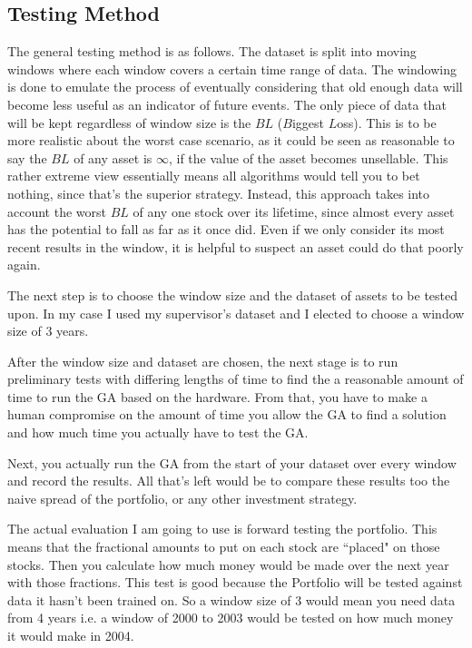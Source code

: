 \documentclass[11pt]{article}
\begin{document}
\subsection{Testing Method}\label{section:TestingMethod}

    The general testing method is as follows. The dataset is split into moving windows
    where each window covers a certain time range of data. The windowing is done to emulate
    the process of eventually considering that old enough data will become less useful
    as an indicator of future events. The only piece of data that will be kept regardless
    of window size is the \(BL\) (\(B\)iggest \(L\)oss). This is to be more realistic about the
    worst case scenario,
    as it could be seen as reasonable to say the \(BL\) of any asset is \(\infty\), if
    the value of the asset becomes unsellable. This rather extreme view essentially means all
    algorithms would tell you to bet nothing, since that's the superior strategy. Instead,
    this approach takes into account the worst \(BL\) of any one stock over its lifetime,
    since almost every asset has the potential to fall as far as it once did. Even if we only
    consider its most recent results in the window, it is helpful to suspect an asset could
    do that poorly again.

    The next step is to choose the window size and the dataset of assets to be tested upon.
    In my case I used my supervisor's dataset \cite{Dataset} and I elected to choose a window
    size of 3 years.

    After the window size and dataset are chosen, the next stage is to run preliminary tests with
    differing lengths of time to find the a reasonable amount of time to run the GA based on
    the hardware. From that, you have to make a human compromise on the amount of time
    you allow the GA to find a solution and how much time you actually have to test the GA.

    Next, you actually run the GA from the start of your dataset over every window and record
    the results. All that's left would be to compare these results too the naive spread of the
    portfolio, or any other investment strategy.

    The actual evaluation I am going to use is forward testing the portfolio. This means that
    the fractional amounts to put on each stock are ``placed" on those stocks. Then you
    calculate how much money would be made over the next year with those fractions. This test
    is good because the Portfolio will be tested against data it hasn't been trained on.
    So a window size of 3 would mean you need data from 4 years i.e. a window of 2000 to 2003
    would be tested on how much money it would make in 2004.
\end{document}
